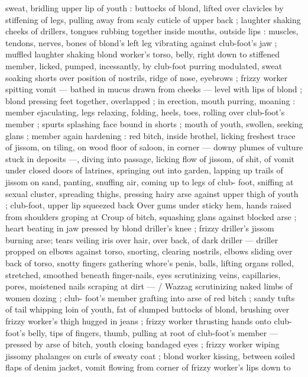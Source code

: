 sweat, bridling upper lip of youth : buttocks of blond, lifted over 
clavicles by stiffening of legs, pulling away from scaly cuticle of 
upper back ; laughter shaking cheeks of drillers, tongues rubbing 
together inside mouths, outside lips : muscles, tendons, nerves, 
bones of blond's left leg vibrating against club-foot's jaw ; muffled 
laughter shaking blond worker's torso, belly, right down to stiffened 
member, licked, pumped, incessantly, by club-foot purring 
modulated, sweat soaking shorts over position of nostrils, ridge of 
nose, eyebrows ; frizzy worker spitting vomit --- bathed in mucus 
drawn from cheeks --- level with lips of blond ; blond pressing feet 
together, overlapped ; in erection, mouth purring, moaning : member 
ejaculating, legs relaxing, folding, heels, toes, rolling over club-foot's 
member ; spurts splashing face bound in shorts ; mouth of youth, 
swollen, seeking glans ; member again hardening : red bitch, inside 
brothel, licking freshest trace of jissom, on tiling, on wood floor of 
saloon, in corner --- downy plumes of vulture stuck in deposits ---, 
diving into passage, licking flow of jissom, of shit, of vomit under 
closed doors of latrines, springing out into garden, lapping up trails 
of jissom on sand, panting, snuffing air, coming up to legs of club- 
foot, sniffing at sexual cluster, spreading thighs, pressing hairy arse 
against upper thigh of youth ; club-foot, upper lip squeezed back 
Over gums under sticky hem, hands raised from shoulders groping at 
Croup of bitch, squashing glans against blocked arse ; heart beating 
in jaw pressed by blond driller's knee ; frizzy driller's jissom burning 
arse; tears veiling iris over hair, over back, of dark driller --- driller 
propped on elbows against torso, snorting, clearing nostrils, elbows 
sliding over back of torso, snotty fingers gathering whore's penis, 
balls, lifting organs rolled, stretched, smoothed beneath finger-nails, 
eyes scrutinizing veins, capillaries, pores, moistened nails scraping 
at dirt --- {\slash} Wazzag scrutinizing naked limbs of women dozing ; club- 
foot's member grafting into arse of red bitch ; sandy tufts of tail 
whipping loin of youth, fat of slumped buttocks of blond, brushing 
over frizzy worker's thigh hugged in jeans ; frizzy worker thrusting 
hands onto club-foot's belly, tips of fingers, thumb, pulling at root of 
club-foot's member --- pressed by arse of bitch, youth closing 
bandaged eyes ; frizzy worker wiping jissomy phalanges on curls of 
sweaty coat ; blond worker kissing, between soiled flaps of denim 
jacket, vomit flowing from corner of frizzy worker's lips down to 
